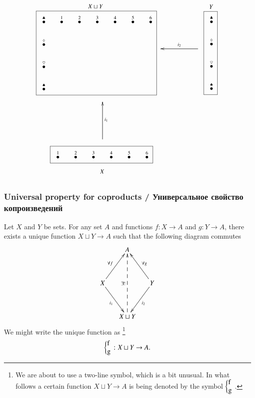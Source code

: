 \documentclass{book}
\def\to{\rightarrow}
\def\taking{\colon}
\newcommand{\LMO}[1]{\stackrel{#1}{\bullet}}
\newcommand{\coprodmap}[2]{{\left\{\parbox{.1in}{#1\\#2}\right.}}
\theoremstyle{theoremENG}
\theoremstyle{lemmaENG}
\newtheorem{lemmaENG}[subsubsection]{\begin{english}Lemma\end{english}}
\theoremstyle{propositionENG}
\theoremstyle{corollaryENG}
\theoremstyle{factENG}
\theoremstyle{remarkENG}
\theoremstyle{exampleENG}
\newtheorem{exampleENG}[subsubsection]{\begin{english}Example\end{english}}
\theoremstyle{warningENG}
\theoremstyle{questionENG}
\theoremstyle{guessENG}
\theoremstyle{answerENG}
\theoremstyle{constructionENG}
\theoremstyle{rulesENG}
\theoremstyle{excENG}
\theoremstyle{appENG}
\theoremstyle{definitionENG}
\theoremstyle{notationENG}
\theoremstyle{conjectureENG}
\theoremstyle{postulateENG}
\theoremstyle{theoremRUS}
\theoremstyle{lemmaRUS}
\theoremstyle{propositionRUS}
\theoremstyle{corollaryRUS}
\theoremstyle{factRUS}
\theoremstyle{remarkRUS}
\theoremstyle{exampleRUS}
\theoremstyle{warningRUS}
\theoremstyle{questionRUS}
\theoremstyle{guessRUS}
\theoremstyle{answerRUS}
\theoremstyle{constructionRUS}
\theoremstyle{rulesRUS}
\theoremstyle{excRUS}
\theoremstyle{appRUS}
\theoremstyle{definitionRUS}
\theoremstyle{notationRUS}
\theoremstyle{conjectureRUS}
\theoremstyle{postulateRUS}
\begin{document}
\begin{english}
\begin{exampleENG}
\begin{align}
\parbox{2.4in}{\begin{center}\small $X\sqcup Y$\vspace{-.1in}\end{center}\fbox{
\xymatrix@=15pt{
\LMO{\clubsuit}&\LMO{1}&\LMO{2}&\LMO{3}&\LMO{4}&\LMO{5}&\LMO{6}\\\LMO{\diamondsuit}\\\LMO{\heartsuit}\\\LMO{\spadesuit}
}}}
\parbox{.9in}{
\xymatrix{~&&\ar[ll]_{i_2}~}
}
\parbox{.3in}{\begin{center}\small $Y$\vspace{-.1in}\end{center}\fbox{
\xymatrix@=15pt{
\LMO{\clubsuit}\\\LMO{\diamondsuit}\\\LMO{\heartsuit}\\\LMO{\spadesuit}
}}}
\\\nonumber
\parbox{1in}{\hspace{-1.4in}\xymatrix{~\\\\\ar[uu]_{i_1}}}
\\\nonumber
\parbox{2.1in}{\hspace{-1.3in}\fbox{
\xymatrix@=15pt{
\LMO{1}&\LMO{2}&\LMO{3}&\LMO{4}&\LMO{5}&\LMO{6}
}}\begin{center}\hspace{-2.6in}\small$X$\end{center}}
\end{align}

\end{exampleENG}


\subsubsection{Universal property for coproducts / Универсальное свойство копроизведений}

\begin{lemmaENG}\label{lemma:up for coprod}

Let $X$ and $Y$ be sets. For any set $A$ and functions $f\taking X\to A$ and $g\taking Y\to A$, there exists a unique function $X\sqcup Y\to A$ such that the following diagram commutes
$$
\xymatrix@=15pt{&A\\\\X\ar[uur]^{\forall f}\ar[ddr]_{i_1}&&Y\ar[uul]_{\forall g}\ar[ddl]^{i_2}\\\\&X\sqcup Y\ar@{-->}[uuuu]^{\exists!}}
$$
We might write the unique function as 
\footnote{We are about to use a two-line symbol, which is a bit unusual. In what follows a certain function $X\sqcup Y\to A$ is being denoted by the symbol $\coprodmap{f}{g}$.}
$$\coprodmap{f}{g}\taking X\sqcup Y\to A.$$


\end{lemmaENG}
\end{english}
\end{document}
